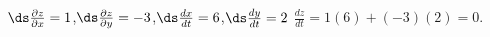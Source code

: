 {$\ds\frac{\partial z}{\partial x} = 1$,\quad $\ds\frac{\partial z}{\partial y} = -3$,\quad $\ds\frac{dx}{dt} = 6$,\quad $\ds\frac{dy}{dt} = 2$}
{$\frac{dz}{dt} = 1(6)+(-3)(2) = 0$.
}